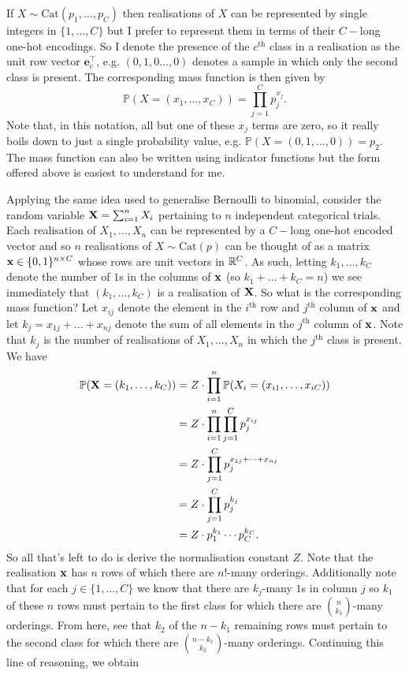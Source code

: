 \documentclass[11pt]{article}
\begin{document}
\begin{appendices}
If $X\sim\text{Cat}(p_1,\dots,p_C)$ then realisations of $X$ can be represented by single integers in $\{1,\dots,C\}$ but I prefer to represent them in terms of their $C-$long one-hot encodings. So I denote the presence of the $c^{\text{th}}$ class in a realisation as the unit row vector $\mathbf{e}_c^\top $, e.g. $(0,1,0\dots,0)$ denotes a sample in which only the second class is present. The corresponding mass function is then given by
$$
\mathbb{P}(X=(x_1,\dots,x_C))
=
\prod_{j=1}^Cp_j^{x_j}.
$$
Note that, in this notation, all but one of these $x_j$ terms are zero, so it really boils down to just a single probability value, e.g. $\mathbb{P}(X=(0,1,\dots,0))=p_2$. The mass function can also be written using indicator functions but the form offered above is easiest to understand for me.

Applying the same idea used to generalise Bernoulli to binomial, consider the random variable $\mathbf{X}=\sum_{i=1}^nX_i$ pertaining to $n$ independent categorical trials. Each realisation of $X_1,\dots,X_n$ can be represented by a $C-$long one-hot encoded vector and so $n$ realisations of $X\sim\text{Cat}(p)$ can be thought of as a matrix $\mathbf{x}\in\{0,1\}^{n\times C}$ whose rows are unit vectors in $\mathbb{R}^C$. As such, letting $k_1,\dots,k_C$ denote the number of $1$s in the columns of $\mathbf{x}$ (so $k_1+\dots+k_C=n$) we see immediately that $(k_1,\dots,k_C)$ is a realisation of $\mathbf{X}$. So what is the corresponding mass function? Let $x_{ij}$ denote the element in the $i^{\text{th}}$ row and $j^{\text{th}}$ column of $\mathbf{x}$ and let $k_j=x_{1j}+\dots+x_{nj}$ denote the sum of all elements in the $j^{\text{th}}$ column of $\mathbf{x}$. Note that $k_j$ is the number of realisations of $X_1,\dots,X_n$ in which the $j^{\text{th}}$ class is present. We have
\begin{align*}
    \mathbb{P}(\mathbf{X}=(k_1,\dots,k_C))
    &=
    Z\cdot\prod_{i=1}^n\mathbb{P}(X_i=(x_{i1},\dots,x_{iC}))\\
    &=
    Z\cdot\prod_{i=1}^n\prod_{j=1}^Cp_j^{x_{ij}}\\
    &=
    Z\cdot\prod_{j=1}^Cp_j^{x_{1j}+\dots+x_{nj}}\\
    &=
    Z\cdot\prod_{j=1}^Cp_j^{k_j}\\
    &=
    Z\cdot p_1^{k_1}\cdots p_C^{k_C}.
\end{align*}
So all that's left to do is derive the normalisation constant $Z$. Note that the realisation $\mathbf{x}$ has $n$ rows of which there are $n!$-many orderings. Additionally note that for each $j\in\{1,\dots,C\}$ we know that there are $k_j$-many $1$s in column $j$ so $k_1$ of these $n$ rows must pertain to the first class for which there are $\binom{n}{k_1}$-many orderings. From here, see that $k_2$ of the $n-k_1$ remaining rows must pertain to the second class for which there are $\binom{n-k_1}{k_2}$-many orderings. Continuing this line of reasoning, we obtain

\end{appendices}
\end{document}
